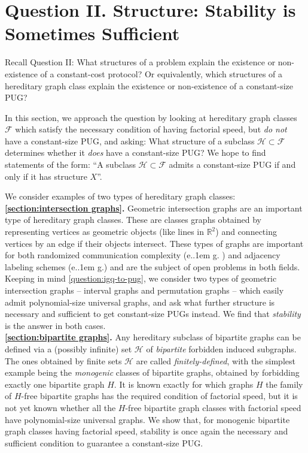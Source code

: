 \documentclass{article}
\makeatletter
\newcommand{\cF}{\ensuremath{\mathcal{F}}}
\newcommand{\cH}{\ensuremath{\mathcal{H}}}
\newcommand{\bR}{\ensuremath{\mathbb{R}}}
\newcommand*\eg{e.\kern.1em g.\@\xspace} %
\makeatother
\begin{document}
\section{Question II. Structure: Stability is Sometimes Sufficient} 
\label{section:stability}

Recall Question II: What structures of a problem explain the existence or non-existence of a
constant-cost protocol? Or equivalently, which structures of a hereditary graph class explain the
existence or non-existence of a constant-size PUG?

In this section, we approach the question by looking at hereditary graph classes $\cF$ which satisfy
the necessary condition of having factorial speed, but \emph{do not} have a constant-size PUG, and
asking: What structure of a subclass $\cH \subset \cF$ determines whether it \emph{does} have a
constant-size PUG? We hope to find statements of the form: ``A subclass $\cH \subset \cF$ admits a
constant-size PUG if and only if it has structure $X$''.

We consider examples of two types of hereditary graph classes:\\

\noindent
\textbf{\cref{section:intersection graphs}.} Geometric intersection graphs are an important type of
hereditary graph classes. These are classes graphs obtained by representing vertices as geometric
objects (like lines in $\bR^2$) and connecting vertices by an edge if their objects intersect. These
types of graphs are important for both randomized communication complexity (\eg
\cite{PS86,HHPTZ22,HHM23,HZ23}) and adjacency labeling schemes (\eg \cite{Spin03,Fit19}) and are the
subject of open problems in both fields. Keeping in mind \cref{question:igq-to-pug}, we consider two
types of geometric intersection graphs -- interval graphs and permutation graphs -- which easily
admit polynomial-size universal graphs, and ask what further structure is necessary and sufficient
to get constant-size PUGs instead. We find that \emph{stability} is the answer in both cases.\\

\noindent
\textbf{\cref{section:bipartite graphs}.}
Any hereditary subclass of bipartite graphs can be defined via a (possibly infinite) set $\cH$
of \emph{bipartite} forbidden induced subgraphs. The ones obtained by finite sets $\cH$ are called
\emph{finitely-defined}, with the simplest example being the \emph{monogenic} classes of bipartite
graphs, obtained by forbidding exactly one bipartite graph $H$. It is known exactly for which graphs
$H$ the family of $H$-free bipartite graphs has the required condition of factorial speed, but it is
not yet known whether all the $H$-free bipartite graph classes with factorial speed have
polynomial-size universal graphs. We show that, for monogenic bipartite graph classes having
factorial speed, stability is once again the necessary and sufficient condition to guarantee a
constant-size PUG.
\end{document}
